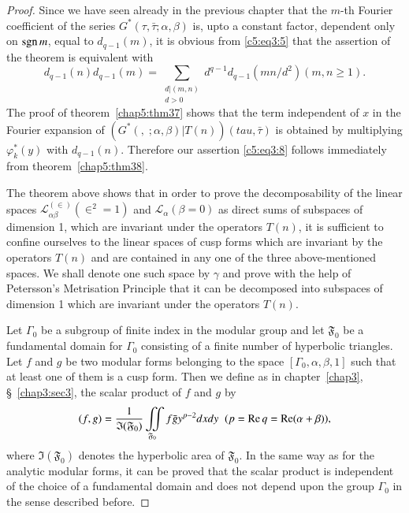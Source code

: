 \begin{proof}
Since we have seen already in the previous chapter that the $m$-th
Fourier coefficient of the series
$G^{\ast}(\tau,\bar{\tau};\alpha,\beta)$ is, upto a constant factor,
dependent only on $\operatorname{sgn} m$, equal to $d_{q-1}(m)$, it is obvious from
\eqref{c5:eq3:5} that the assertion of the theorem is equivalent with
\begin{equation*}
d_{q-1}(n) d_{q-1}(m) = \sum_{\substack{d|(m,n)\\d>0}} d^{q-1} d_{q-1}
(mn/d^2) (m,n \geq 1). \tag{8}\label{c5:eq3:8}
\end{equation*}
The proof of theorem~\ref{chap5:thm37} shows that the term 
independent of $x$ in the
Fourier expansion of $(G^{\ast}(, \; ;\alpha,\beta)|
T(n))(tau,\bar{\tau})$ is obtained by multiplying 
$\varphi^{\ast}_k(y)$ with $d_{q-1}(n)$. Therefore our assertion \eqref{c5:eq3:8}
follows immediately from theorem~\ref{chap5:thm38}.

The theorem \pageoriginale above shows that in order to prove the
decomposability of the linear spaces
$\mathscr{L}^{(\in)}_{\alpha\beta}(\in^2=1)$ and
$\mathscr{L}_{\alpha}(\beta=0)$ as direct sums of subspaces of
dimension 1, which are invariant under the operators $T(n)$, it is
sufficient to confine ourselves to the linear spaces of cusp forms
which are invariant by the operators $T(n)$ and are contained in any
one of the three above-mentioned spaces. We shall denote one such
space by $\gamma$ and prove with the help of Petersson's Metrisation
Principle that it can be decomposed into subspaces of dimension 1
which are invariant under the operators $T(n)$.

Let $\Gamma_0$ be a subgroup of finite index in the modular group and
let $\mathfrak{F}_0$ be a fundamental domain for $\Gamma_0$ consisting
of a finite number of hyperbolic triangles. Let $f$ and $g$ be two
modular forms belonging to the space $[\Gamma_0, \alpha,\beta,1]$ such
that at least one of them is a cusp form. Then we define as in 
chapter~\ref{chap3}, \S~\ref{chap3:sec3}, the scalar product of $f$ and $g$ by
$$
(f,g) = \frac{1}{\mathfrak{I}(\mathfrak{F}_0)}
\iint\limits_{\mathfrak{F}_0} f\bar{g} y^{p-2} dxdy \;\; (p =\operatorname{Re} q =\operatorname{Re}
(\alpha+\beta)),
$$
where $\mathfrak{I}(\mathfrak{F}_0)$ denotes the hyperbolic area of
$\mathfrak{F}_0$. In the same way as for the analytic modular forms,
it can be proved that the scalar product is independent of the choice
of a fundamental domain and does not depend upon the group $\Gamma_0$
in the sense described before.
\end{proof}

